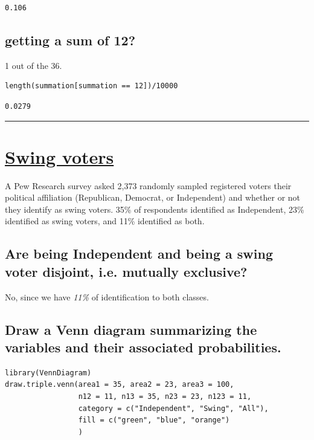 \documentclass[11pt]{article}
\begin{document}
\begin{verbatim}
0.106
\end{verbatim}

\subsection{getting a sum of 12?}
\label{sec:org89549f7}
1 out of the 36.

\begin{verbatim}
length(summation[summation == 12])/10000
\end{verbatim}

\begin{verbatim}
0.0279
\end{verbatim}


\noindent\rule{\textwidth}{0.5pt}
\section{\underline{Swing voters}}
\label{sec:org8043e99}
A Pew Research survey asked 2,373 randomly sampled registered voters their political affiliation (Republican, Democrat, or Independent) and whether or not they identify as swing voters. 35\% of respondents identified as Independent, 23\% identified as swing voters, and 11\% identified as both.
\subsection{Are being Independent and being a swing voter disjoint, i.e. mutually exclusive?}
\label{sec:org416f4ae}
No, since we have \emph{11\%} of identification to both classes.
\subsection{Draw a Venn diagram summarizing the variables and their associated probabilities.}
\label{sec:org099194e}
\begin{verbatim}
library(VennDiagram)
draw.triple.venn(area1 = 35, area2 = 23, area3 = 100,
                 n12 = 11, n13 = 35, n23 = 23, n123 = 11,
                 category = c("Independent", "Swing", "All"),
                 fill = c("green", "blue", "orange")
                 )
\end{verbatim}
\end{document}
